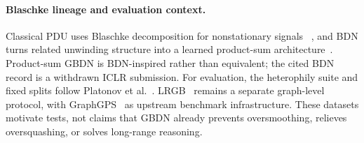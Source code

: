 \paragraph{Blaschke lineage and evaluation context.}
Classical PDU uses Blaschke decomposition for nonstationary signals
~\cite{coifman2025pdu}, and BDN turns related unwinding structure into a learned
product-sum architecture~\cite{zhang2025bdn}. Product-sum GBDN is BDN-inspired rather
than equivalent; the cited BDN record is a withdrawn ICLR submission. For evaluation,
the heterophily suite and fixed splits follow Platonov et
al.~\cite{platonov2023heterophily}. LRGB~\cite{dwivedi2022lrgb} remains a separate
graph-level protocol, with GraphGPS~\cite{rampasek2022graphgps} as upstream benchmark
infrastructure. These datasets motivate tests, not claims that GBDN already prevents
oversmoothing, relieves oversquashing, or solves long-range reasoning.
